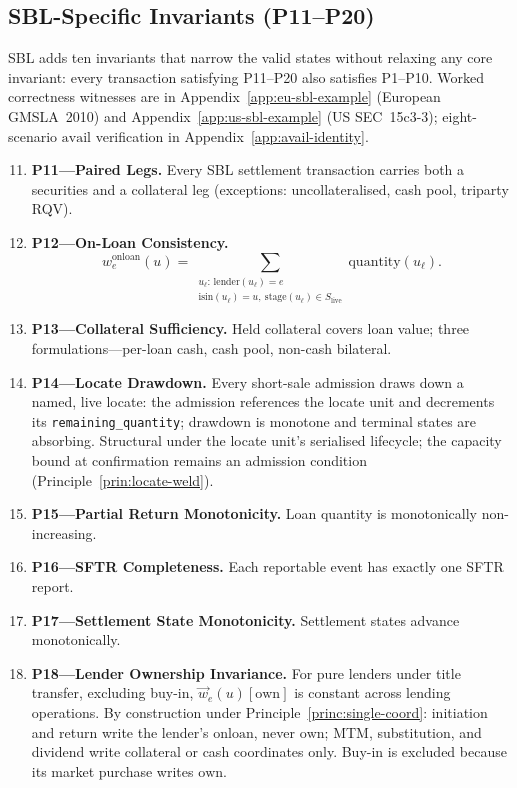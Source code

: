 \subsection{SBL-Specific Invariants (P11--P20)}
\label{sec:sbl-invariants}

SBL adds ten invariants that narrow the valid states without relaxing any core invariant: every transaction satisfying P11--P20 also satisfies P1--P10. Worked correctness witnesses are in Appendix~\ref{app:eu-sbl-example} (European GMSLA~2010) and Appendix~\ref{app:us-sbl-example} (US SEC~15c3-3); eight-scenario $\mathrm{avail}$ verification in Appendix~\ref{app:avail-identity}.

\begin{invariant}[P11--P20]
\label{inv:P11}\label{inv:P20}
\begin{enumerate}\setcounter{enumi}{10}
\item \textbf{P11---Paired Legs.} Every SBL settlement transaction carries both a securities and a collateral leg (exceptions: uncollateralised, cash pool, triparty RQV).
\item \textbf{P12---On-Loan Consistency.}
\[ w^{\mathrm{onloan}}_e(u) = \sum_{\substack{u_\ell:\,\mathrm{lender}(u_\ell)=e\\ \mathrm{isin}(u_\ell)=u,\ \mathrm{stage}(u_\ell)\in S_{\mathrm{live}}}} \mathrm{quantity}(u_\ell). \]
\item \textbf{P13---Collateral Sufficiency.} Held collateral covers loan value; three formulations---per-loan cash, cash pool, non-cash bilateral.
\item \textbf{P14---Locate Drawdown.} Every short-sale admission draws down a named, live locate: the admission references the locate unit and decrements its \texttt{remaining\_quantity}; drawdown is monotone and terminal states are absorbing. Structural under the locate unit's serialised lifecycle; the capacity bound at confirmation remains an admission condition (Principle~\ref{prin:locate-weld}).
\item \textbf{P15---Partial Return Monotonicity.} Loan quantity is monotonically non-increasing.
\item \textbf{P16---SFTR Completeness.} Each reportable event has exactly one SFTR report.
\item \textbf{P17---Settlement State Monotonicity.} Settlement states advance monotonically.
\item \textbf{P18---Lender Ownership Invariance.} For pure lenders under title transfer, excluding buy-in, $\vec{w}_e(u)[\mathrm{own}]$ is constant across lending operations. By construction under Principle~\ref{princ:single-coord}: initiation and return write the lender's $\mathrm{onloan}$, never $\mathrm{own}$; MTM, substitution, and dividend write collateral or cash coordinates only. Buy-in is excluded because its market purchase writes $\mathrm{own}$.

\end{enumerate}
\end{invariant}
